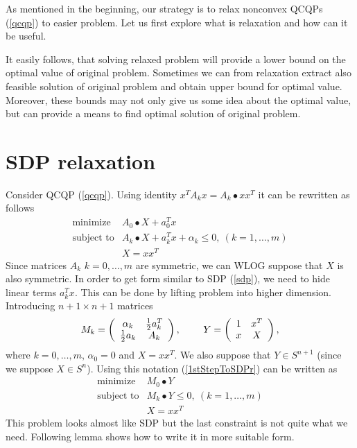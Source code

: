 \documentclass[10pt,oneside]{book}
\theoremstyle{definition}
\begin{document}
As mentioned in the beginning, our strategy is to relax nonconvex QCQPs (\ref{qcqp}) to easier problem. Let us first explore what is relaxation and how can it be useful.


It easily follows, that solving relaxed problem will provide a lower bound on the optimal value of original problem. Sometimes we can from relaxation extract also feasible solution of original problem and obtain upper bound for optimal value. Moreover, these bounds may not only give us some idea about the optimal value, but can provide a means to find optimal solution of original problem. 

\section{SDP relaxation}
Consider QCQP (\ref{qcqp}). Using identity $x^TA_kx = A_k\bullet xx^T$ it can be rewritten as follows
\begin{equation} 
\label{1stStepToSDPr}
\begin{array}{ll}
\mbox{minimize}& A_0\bullet X + a_0^Tx \\
\mbox{subject to}& A_k\bullet X+ a_k^Tx + \alpha_k \leq 0, \  (k = 1,\dots ,m)\\
& X = xx^T
\end{array} 
\end{equation}
Since matrices $A_k$ $k=0,\dots, m$ are symmetric, we can WLOG suppose that $X$ is also symmetric. In order to get form similar to SDP (\ref{sdp}), we need to hide linear terms $a_k^Tx$. This can be done by lifting problem into higher dimension. Introducing $n+1\times n+1$ matrices
$$M_k = \left(
\begin{array}{cc}
\alpha_k & {1\over 2}a_k^T \\
{1\over 2}a_k & A_k
\end{array}\right), 
\ \ \ \ \ \ \
Y =  \left(
\begin{array}{cc}
1 & x^T \\
x & X
\end{array}\right), 
$$
where $k=0,\dots ,m$, $\alpha_0=0$ and $X=xx^T$. We also suppose that $Y\in S^{n+1}$ (since we suppose $X\in S^n$).  Using this notation (\ref{1stStepToSDPr}) can be written as
\begin{equation} 
\label{2ndStepToSDPr}
\begin{array}{ll}
\mbox{minimize}& M_0\bullet Y \\
\mbox{subject to}& M_k\bullet Y \leq 0, \  (k = 1,\dots ,m)\\
& X = xx^T
\end{array} 
\end{equation}
This problem looks almost like SDP but the last constraint is not quite what we need. Following lemma shows how to write it in more suitable form.
\end{document}

